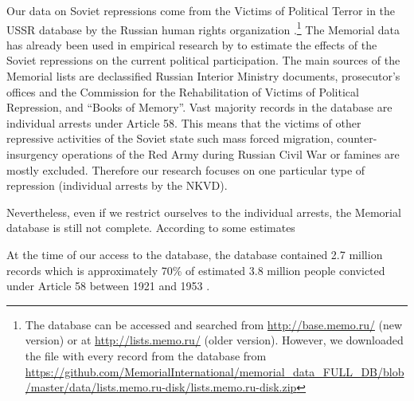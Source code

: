 Our data on Soviet repressions come from  the Victims of Political Terror in the USSR database by the Russian human rights organization \citet{memorial_zhertvy_2017}.\footnote{The database can be accessed and searched from  \url{http://base.memo.ru/} (new version) or at \url{http://lists.memo.ru/} (older version). However, we downloaded the file with every record from the database from \url{https://github.com/MemorialInternational/memorial_data_FULL_DB/blob/master/data/lists.memo.ru-disk/lists.memo.ru-disk.zip}} 
The Memorial data has already been used in empirical research by \citet{zhukov_stalins_2018} to estimate the  effects of the Soviet repressions on the current political participation. 
 The main sources of the Memorial lists are declassified Russian Interior Ministry documents, prosecutor’s offices and the Commission for the Rehabilitation of Victims of Political Repression, and \enquote{Books of Memory}. 
Vast  majority records in the database are individual arrests under  Article 58. 
This means that the victims of other repressive activities of the Soviet state such mass forced migration, counter-insurgency operations of the Red Army during Russian Civil War or famines are mostly excluded. Therefore our research focuses on one  particular type of repression (individual arrests by the NKVD). 

Nevertheless, even if we restrict ourselves to the individual arrests, the Memorial database is still not complete.
According to some estimates

At the time of our access to the database, the database contained 2.7 million records which is approximately 70\% of estimated 3.8 million people convicted under Article 58 between 1921 and 1953 \citep{zhukov_stalins_2018}.



